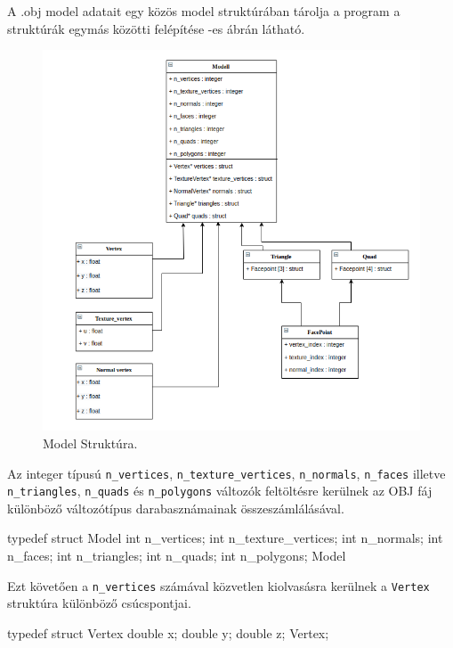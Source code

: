 A .obj model adatait egy közös model struktúrában tárolja a program a struktúrák egymás közötti felépítése -es ábrán látható.
\bigskip
\begin{figure}[h]
\centering
\includegraphics[width=\textwidth]{images/struct.png}
\caption{Model Struktúra.}
\label{fig:struct}
\end{figure}
\bigskip

Az integer típusú \texttt{n\_vertices}, \texttt{n\_texture\_vertices}, \texttt{n\_normals}, \texttt{n\_faces} illetve \texttt{n\_triangles}, \texttt{n\_quads} és \texttt{n\_polygons} változók feltöltésre kerülnek az OBJ fáj különböző változótípus darabasznámainak összeszámlálásával.
\begin{python}
typedef struct Model
{
    int n_vertices;
    int n_texture_vertices;
    int n_normals;
    int n_faces;
    int n_triangles;
    int n_quads;
    int n_polygons;
}Model
\end{python}
\bigskip

Ezt követően a \texttt{n\_vertices} számával közvetlen kiolvasásra kerülnek a \texttt{Vertex} struktúra különböző csúcspontjai.
\begin{python} 
typedef struct Vertex
{
    double x;
    double y;
    double z;
}Vertex;
\end{python}
\bigskip

